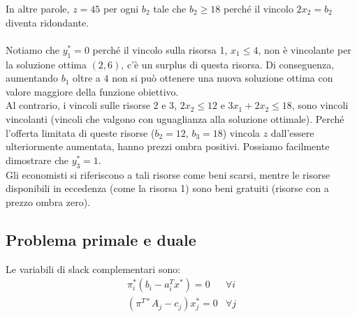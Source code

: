 \documentclass[12pt,a4paper]{article}
\begin{document}
In altre parole, $z=45$ per ogni $b_2$ tale che $b_2 \geq 18$ perché il vincolo $2x_2=b_2$ diventa ridondante.\\
\\
Notiamo che $y_1^*=0$ perché il vincolo sulla risorsa 1, $x_1 \leq 4$, non è vincolante per la soluzione ottima $(2,6)$, c'è un surplus di questa risorsa. Di conseguenza, aumentando $b_1$ oltre a $4$ non si può ottenere una nuova soluzione ottima con valore maggiore della funzione obiettivo.\\
Al contrario, i vincoli sulle risorse 2 e 3, $2x_2 \leq 12$ e $3x_1 + 2x_2 \leq 18$, sono vincoli vincolanti (vincoli che valgono con uguaglianza alla soluzione ottimale). Perché l'offerta limitata di queste risorse ($b_2 = 12$, $b_3 = 18$) vincola $z$ dall'essere ulteriormente aumentata, hanno prezzi ombra positivi. Possiamo facilmente dimostrare che $y_3^*=1$.\\
Gli economisti si riferiscono a tali risorse come beni scarsi, mentre le risorse disponibili in eccedenza (come la risorsa 1) sono beni gratuiti (risorse con a prezzo ombra zero).

\subsection{Problema primale e duale}

\begin{Parallel}{0.45 \textwidth}{0.45 \textwidth}
\end{Parallel}

\Sep \noindent
Le variabili di slack complementari sono:
$$\begin{array}{cl}
\pi_i^*(b_i-a_i^Tx^*)=0  & \forall i\\
(\pi^{T*}A_j-c_j)x_j^* = 0 & \forall j
\end{array}$$
\end{document}
